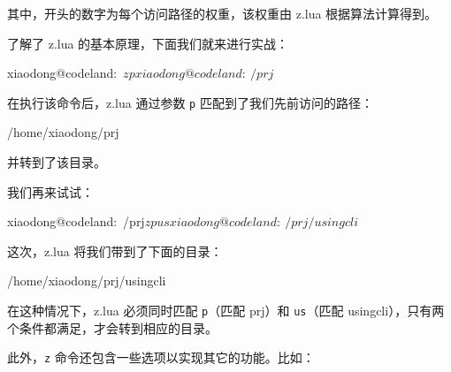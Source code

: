 \documentclass[]{ctexbook}
\newenvironment{Shaded}{\begin{snugshade}}{\end{snugshade}}
\newcommand{\ExtensionTok}[1]{#1}
\newcommand{\NormalTok}[1]{#1}
\begin{document}
其中，开头的数字为每个访问路径的权重，该权重由 z.lua 根据算法计算得到。

了解了 z.lua 的基本原理，下面我们就来进行实战：

\begin{Shaded}
\begin{Highlighting}[]
\ExtensionTok{xiaodong@codeland}\NormalTok{:~$ z p}
\ExtensionTok{xiaodong@codeland}\NormalTok{:~/prj$}
\end{Highlighting}
\end{Shaded}

在执行该命令后，z.lua 通过参数 \texttt{p} 匹配到了我们先前访问的路径：

\begin{Shaded}
\begin{Highlighting}[]
\ExtensionTok{/home/xiaodong/prj}
\end{Highlighting}
\end{Shaded}

并转到了该目录。

我们再来试试：

\begin{Shaded}
\begin{Highlighting}[]
\ExtensionTok{xiaodong@codeland}\NormalTok{:~/prj$ z p us}
\ExtensionTok{xiaodong@codeland}\NormalTok{:~/prj/usingcli$}
\end{Highlighting}
\end{Shaded}

这次，z.lua 将我们带到了下面的目录：

\begin{Shaded}
\begin{Highlighting}[]
\ExtensionTok{/home/xiaodong/prj/usingcli}
\end{Highlighting}
\end{Shaded}

在这种情况下，z.lua 必须同时匹配 \texttt{p}（匹配 prj）和 \texttt{us}（匹配 usingcli），只有两个条件都满足，才会转到相应的目录。

此外，\texttt{z} 命令还包含一些选项以实现其它的功能。比如：
\end{document}
